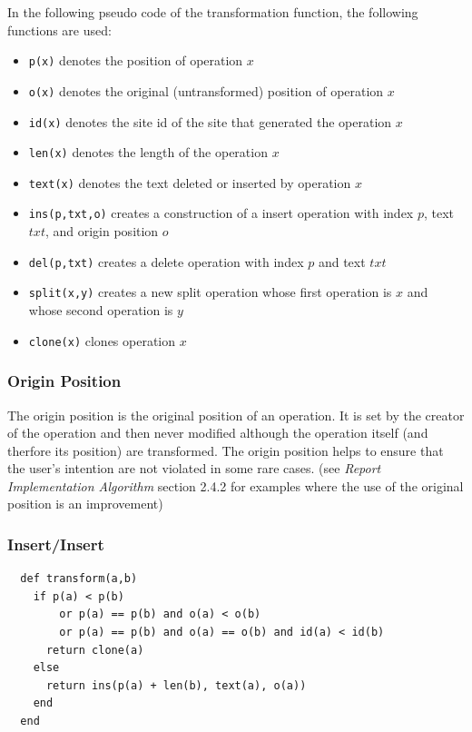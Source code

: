 In the following pseudo code of the transformation function, the following
functions are used:
\begin{itemize}
 \item \texttt{p(x)} denotes the position of operation $x$
 \item \texttt{o(x)} denotes the original (untransformed) position of operation $x$
 \item \texttt{id(x)} denotes the site id of the site that generated the operation $x$
 \item \texttt{len(x)} denotes the length of the operation $x$
 \item \texttt{text(x)} denotes the text deleted or inserted by operation $x$
 \item \texttt{ins(p,txt,o)} creates a construction of a insert operation with index $p$, text $txt$, and origin position $o$
 \item \texttt{del(p,txt)} creates a delete operation with index $p$ and text $txt$
 \item \texttt{split(x,y)} creates a new split operation whose first operation is $x$ and whose second operation is $y$
 \item \texttt{clone(x)} clones operation $x$
\end{itemize}


\subsubsection{Origin Position}
The origin position is the original position of an operation. It is set by
the creator of the operation and then never modified although the operation
itself (and therfore its position) are transformed. The origin position 
helps to ensure that the user's intention are not violated in some rare
cases. (see \emph{Report Implementation Algorithm} section 2.4.2 for 
examples where the use of the original position is an improvement)


\subsubsection{Insert/Insert}

\small{\begin{verbatim}
  def transform(a,b)
    if p(a) < p(b) 
        or p(a) == p(b) and o(a) < o(b) 
        or p(a) == p(b) and o(a) == o(b) and id(a) < id(b)
      return clone(a)
    else
      return ins(p(a) + len(b), text(a), o(a))
    end
  end
\end{verbatim}}


